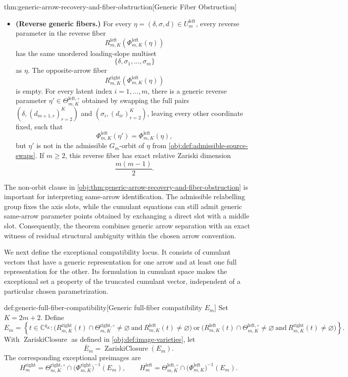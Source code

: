 \begin{theoremv}{thm:generic-arrow-recovery-and-fiber-obstruction}[Generic Fiber Obstruction]
\begin{itemize}
\item \textbf{(Reverse generic fibers.)}  For every \(\eta=(\delta,\sigma,d)\in U^{\mathrm{left}}_m\), every reverse parameter in the reverse fiber
\[
R^{\mathrm{left}}_{m,K}\!\left(\Phi^{\mathrm{left}}_{m,K}(\eta)\right)
\]
has the same unordered loading-slope multiset
\[
\{\delta,\sigma_1,\ldots,\sigma_m\}
\]
as \(\eta\).  The opposite-arrow fiber
\[
R^{\mathrm{right}}_{m,K}\!\left(\Phi^{\mathrm{left}}_{m,K}(\eta)\right)
\]
is empty.  For every latent index \(i=1,\ldots,m\), there is a generic reverse parameter \(\eta'\in\Theta^{\mathrm{left},\circ}_{m,K}\) obtained by swapping the full pairs \((\delta,(d_{m+1,r})_{r=2}^K)\) and \((\sigma_i,(d_{ir})_{r=2}^K)\), leaving every other coordinate fixed, such that
\[
\Phi^{\mathrm{left}}_{m,K}(\eta')
=
\Phi^{\mathrm{left}}_{m,K}(\eta),
\]
but \(\eta'\) is not in the admissible \(G_m\)-orbit of \(\eta\) from \cref{obj:def:admissible-source-swaps}.  If \(m\ge 2\), this reverse fiber has exact relative Zariski dimension
\[
\frac{m(m-1)}{2}.
\]
\end{itemize}
\end{theoremv}

The non-orbit clause in \cref{obj:thm:generic-arrow-recovery-and-fiber-obstruction} is important for interpreting same-arrow identification. The admissible relabelling group fixes the axis slots, while the cumulant equations can still admit generic same-arrow parameter points obtained by exchanging a direct slot with a middle slot. Consequently, the theorem combines generic arrow separation with an exact witness of residual structural ambiguity within the chosen arrow convention.

We next define the exceptional compatibility locus. It consists of cumulant vectors that have a generic representation for one arrow and at least one full representation for the other. Its formulation in cumulant space makes the exceptional set a property of the truncated cumulant vector, independent of a particular chosen parametrization.

\begin{definitionv}{def:generic-full-fiber-compatibility}[Generic full-fiber compatibility \(E_m\)]
Set \(K=2m+2\). Define
\[
E_m
=
\left\{
t\in \mathbb C^{q_K}:
\bigl(R^{\mathrm{right}}_{m,K}(t)\cap \Theta^{\mathrm{right},\circ}_{m,K}\neq\varnothing
\ \text{and}\ 
R^{\mathrm{left}}_{m,K}(t)\neq\varnothing\bigr)
\ \text{or}\
\bigl(R^{\mathrm{left}}_{m,K}(t)\cap \Theta^{\mathrm{left},\circ}_{m,K}\neq\varnothing
\ \text{and}\ 
R^{\mathrm{right}}_{m,K}(t)\neq\varnothing\bigr)
\right\}.
\]
With \(\operatorname{ZariskiClosure}\) as defined in \cref{obj:def:image-varieties}, let
\[
\overline E_m=\operatorname{ZariskiClosure}(E_m).
\]
The corresponding exceptional preimages are
\[
H^{\mathrm{right}}_m
=
\Theta^{\mathrm{right},\circ}_{m,K}
\cap
\bigl(\Phi^{\mathrm{right}}_{m,K}\bigr)^{-1}(E_m),
\qquad
H^{\mathrm{left}}_m
=
\Theta^{\mathrm{left},\circ}_{m,K}
\cap
\bigl(\Phi^{\mathrm{left}}_{m,K}\bigr)^{-1}(E_m).
\]
\end{definitionv}

